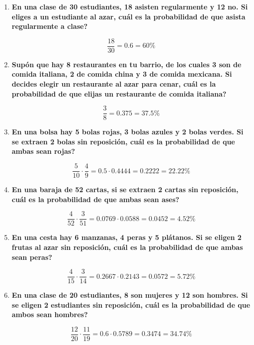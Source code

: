\documentclass[12pt]{article}
\begin{document}
\begin{enumerate}[label=\textbf{\arabic*.}]
        \item \textbf{En una clase de 30 estudiantes, 18 asisten regularmente y 12 no. Si eliges a
                        un estudiante al azar, \textquestiondown cuál es la probabilidad de que asista regularmente a
                        clase?}

                        \[\frac{18}{30} = 0.6 = 60\%\]
        
        \item \textbf{Supón que hay 8 restaurantes en tu barrio, de los cuales 3 son de comida
                        italiana, 2 de comida china y 3 de comida mexicana. Si decides elegir un
                        restaurante al azar para cenar, \textquestiondown cuál es la probabilidad de que elijas un
                        restaurante de comida italiana?}

                        \[\frac{3}{8} = 0.375 = 37.5\%\]
        
        \item \textbf{En una bolsa hay 5 bolas rojas, 3 bolas azules y 2 bolas verdes. Si se
                        extraen 2 bolas sin reposición, \textquestiondown cuál es la probabilidad de que ambas sean
                        rojas?}

                        \[\frac{5}{10} \cdot \frac{4}{9} = 0.5 \cdot 0.4444 = 0.2222 = 22.22\%\]
        
        \item \textbf{En una baraja de 52 cartas, si se extraen 2 cartas sin reposición, \textquestiondown cuál es la
                        probabilidad de que ambas sean ases?}

                        \[\frac{4}{52} \cdot \frac{3}{51} = 0.0769 \cdot 0.0588 = 0.0452= 4.52\%\]
        
        \item \textbf{En una cesta hay 6 manzanas, 4 peras y 5 plátanos. Si se eligen 2 frutas al
                        azar sin reposición, \textquestiondown cuál es la probabilidad de que ambas sean peras?}

                        \[\frac{4}{15} \cdot \frac{3}{14} = 0.2667 \cdot 0.2143 = 0.0572 = 5.72\%\]
        
        \item \textbf{En una clase de 20 estudiantes, 8 son mujeres y 12 son hombres. Si se
                        eligen 2 estudiantes sin reposición, \textquestiondown cuál es la probabilidad de que ambos
                        sean hombres?}

                        \[\frac{12}{20} \cdot \frac{11}{19} = 0.6 \cdot 0.5789 = 0.3474 = 34.74\%\]
    \end{enumerate}
\end{document}

